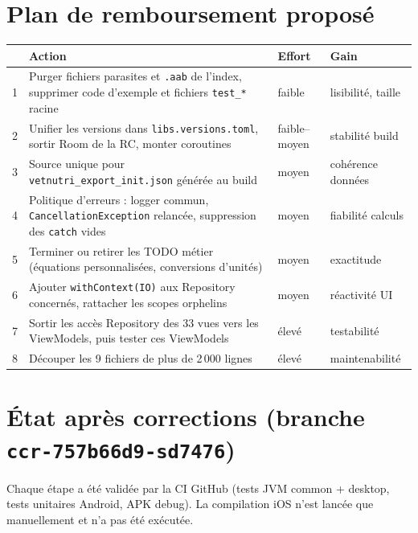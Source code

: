 \documentclass[11pt,a4paper]{article}
\newcommand{\code}[1]{\texttt{#1}}
\begin{document}
\section{Plan de remboursement proposé}
\begin{longtable}{p{0.5cm}p{9.5cm}p{2cm}p{2.3cm}}
\toprule
 & Action & Effort & Gain \\
\midrule
1 & Purger fichiers parasites et \code{.aab} de l'index, supprimer code d'exemple et fichiers \code{test\_*} racine & faible & lisibilité, taille \\
2 & Unifier les versions dans \code{libs.versions.toml}, sortir Room de la RC, monter coroutines & faible--moyen & stabilité build \\
3 & Source unique pour \code{vetnutri\_export\_init.json} générée au build & moyen & cohérence données \\
4 & Politique d'erreurs : logger commun, \code{CancellationException} relancée, suppression des \code{catch} vides & moyen & fiabilité calculs \\
5 & Terminer ou retirer les TODO métier (équations personnalisées, conversions d'unités) & moyen & exactitude \\
6 & Ajouter \code{withContext(IO)} aux Repository concernés, rattacher les scopes orphelins & moyen & réactivité UI \\
7 & Sortir les accès Repository des 33 vues vers les ViewModels, puis tester ces ViewModels & élevé & testabilité \\
8 & Découper les 9 fichiers de plus de 2\,000 lignes & élevé & maintenabilité \\
\bottomrule
\end{longtable}

\section{État après corrections (branche \code{ccr-757b66d9-sd7476})}
Chaque étape a été validée par la CI GitHub (tests JVM common + desktop, tests unitaires
Android, APK debug). La compilation iOS n'est lancée que manuellement et n'a pas été exécutée.
\end{document}
